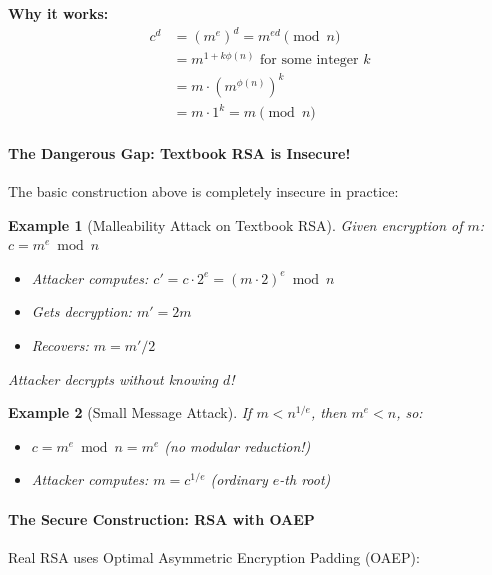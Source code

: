 \documentclass[11pt,a4paper]{article}
\newtheorem{example}{Example}
\begin{document}
\textbf{Why it works:}
\begin{align}
c^d &= (m^e)^d = m^{ed} \pmod{n}\\
&= m^{1 + k\phi(n)} \text{ for some integer } k\\
&= m \cdot (m^{\phi(n)})^k\\
&= m \cdot 1^k = m \pmod{n}
\end{align}

\paragraph{The Dangerous Gap: Textbook RSA is Insecure!}

The basic construction above is completely insecure in practice:

\begin{example}[Malleability Attack on Textbook RSA]
Given encryption of $m$: $c = m^e \bmod n$
\begin{itemize}
    \item Attacker computes: $c' = c \cdot 2^e = (m \cdot 2)^e \bmod n$
    \item Gets decryption: $m' = 2m$
    \item Recovers: $m = m'/2$
\end{itemize}
Attacker decrypts without knowing $d$!
\end{example}

\begin{example}[Small Message Attack]
If $m < n^{1/e}$, then $m^e < n$, so:
\begin{itemize}
    \item $c = m^e \bmod n = m^e$ (no modular reduction!)
    \item Attacker computes: $m = c^{1/e}$ (ordinary $e$-th root)
\end{itemize}
\end{example}

\paragraph{The Secure Construction: RSA with OAEP}

Real RSA uses Optimal Asymmetric Encryption Padding (OAEP):
\end{document}

